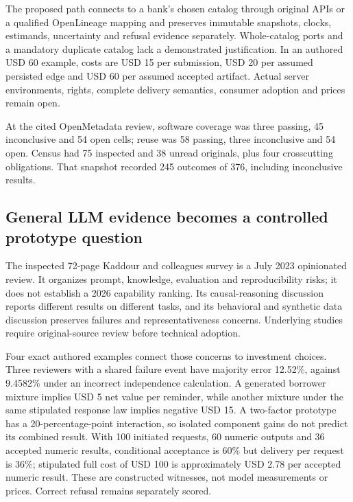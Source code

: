 The proposed path connects to a bank's chosen catalog through original
APIs or a qualified OpenLineage mapping and preserves immutable
snapshots, clocks, estimands, uncertainty and refusal evidence
separately. Whole-catalog ports and a mandatory duplicate catalog lack a
demonstrated justification. In an authored USD 60 example, costs are USD
15 per submission, USD 20 per assumed persisted edge and USD 60 per
assumed accepted artifact. Actual server environments, rights, complete
delivery semantics, consumer adoption and prices remain open.

At the cited OpenMetadata review, software coverage was three passing,
45 inconclusive and 54 open cells; reuse was 58 passing, three
inconclusive and 54 open. Census had 75 inspected and 38 unread
originals, plus four crosscutting obligations. That snapshot recorded
245 outcomes of 376, including inconclusive results.
\citep{sp24openmetadata_reader,sp24openmetadata_progress}

\hypertarget{general-llm-evidence-becomes-a-controlled-prototype-question}{%
\subsection{General LLM evidence becomes a controlled prototype
question}\label{general-llm-evidence-becomes-a-controlled-prototype-question}}

The inspected 72-page Kaddour and colleagues survey is a July 2023
opinionated review. It organizes prompt, knowledge, evaluation and
reproducibility risks; it does not establish a 2026 capability ranking.
Its causal-reasoning discussion reports different results on different
tasks, and its behavioral and synthetic data discussion preserves
failures and representativeness concerns. Underlying studies require
original-source review before technical adoption.
\citep{exec24_llmchallenges_original}

Four exact authored examples connect those concerns to investment
choices. Three reviewers with a shared failure event have majority error
12.52\%, against 9.4582\% under an incorrect independence calculation. A
generated borrower mixture implies USD 5 net value per reminder, while
another mixture under the same stipulated response law implies negative
USD 15. A two-factor prototype has a 20-percentage-point interaction, so
isolated component gains do not predict its combined result. With 100
initiated requests, 60 numeric outputs and 36 accepted numeric results,
conditional acceptance is 60\% but delivery per request is 36\%;
stipulated full cost of USD 100 is approximately USD 2.78 per accepted
numeric result. These are constructed witnesses, not model measurements
or prices. Correct refusal remains separately
scored.\citep{exec24_llmchallenges_reference}


